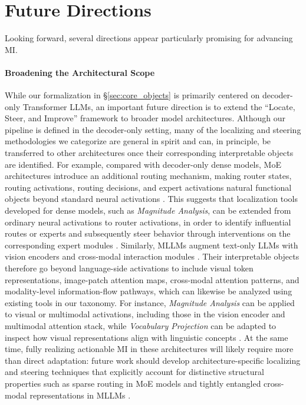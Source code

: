 \documentclass[11pt,letterpaper]{mystyle}
\begin{document}
\section{Future Directions}
\label{sec:future_directions}
Looking forward, several directions appear particularly promising for advancing MI.

\paragraph{Broadening the Architectural Scope}
While our formalization in \S\ref{sec:core_objects} is primarily centered on decoder-only Transformer LLMs, an important future direction is to extend the ``Locate, Steer, and Improve'' framework to broader model architectures. Although our pipeline is defined in the decoder-only setting, many of the localizing and steering methodologies we categorize are general in spirit and can, in principle, be transferred to other architectures once their corresponding interpretable objects are identified. For example, compared with decoder-only dense models, MoE architectures introduce an additional routing mechanism, making router states, routing activations, routing decisions, and expert activations natural functional objects beyond standard neural activations \citep{shazeer2017outrageously,fedus2022switch,zhou2022expertchoice,wang2025semanticrouting}. This suggests that localization tools developed for dense models, such as \textit{Magnitude Analysis}, can be extended from ordinary neural activations to router activations, in order to identify influential routes or experts and subsequently steer behavior through interventions on the corresponding expert modules \citep{wang2025two,wang2025semanticrouting,routers2024visionmoe}. Similarly, MLLMs augment text-only LLMs with vision encoders and cross-modal interaction modules \citep{liu2023visual,li2023blip2,alayrac2022flamingo,lin2025survey}. Their interpretable objects therefore go beyond language-side activations to include visual token representations, image-patch attention maps, cross-modal attention patterns, and modality-level information-flow pathways, which can likewise be analyzed using existing tools in our taxonomy. For instance, \textit{Magnitude Analysis} can be applied to visual or multimodal activations, including those in the vision encoder and multimodal attention stack, while \textit{Vocabulary Projection} can be adapted to inspect how visual representations align with linguistic concepts \citep{neo2024towards,yu2024understanding,bi2025unveiling,zhang2025crossmodal}. At the same time, fully realizing actionable MI in these architectures will likely require more than direct adaptation: future work should develop architecture-specific localizing and steering techniques that explicitly account for distinctive structural properties such as sparse routing in MoE models and tightly entangled cross-modal representations in MLLMs \citep{lin2025survey}.
\end{document}
